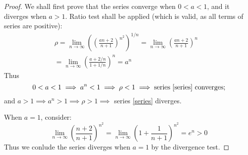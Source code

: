 \documentclass[12pt, a4paper]{article}
\theoremstyle{definition}
\theoremstyle{remark}
\begin{document}
\begin{proof}
	We shall first prove that the series converge when $0<a<1$, and it diverges when $a>1$.
	Ratio test shall be applied (which is valid, as all terms of series are positive):
\begin{equation}\label{ratio}
	\begin{split}
		\rho=\lim _{n\to \infty}\left( \left( \frac{an+2}{n+1}\right)^{n^2}\right)^{1/n} = \lim_{n\to \infty}\left( \frac{an+2}{n+1}\right)^{n}& \\
		= \lim _{n\to \infty}\left(\frac{a+2/n}{1+1/n}\right)^n = a^n 
	\end{split}
\end{equation}
Thus
\[0<a<1 \implies a^n<1 \implies \rho <1 \implies  \text{series \eqref{series} converges};\] and $a>1 \implies a^n>1 \implies \rho >1 \implies $ series \eqref{series} diverges.

When $a=1$, consider:
\begin{equation}
	\lim_{n \to \infty}\left( \frac{n+2}{n+1}\right)^{n^2} = \lim_{n \to \infty}\left( 1+\frac{1}{n+1}\right)^{n^2} = e^n>0
\end{equation}
Thus we conlude the series diverges when $a=1$ by the divergence test.
\end{proof}
\end{document}

